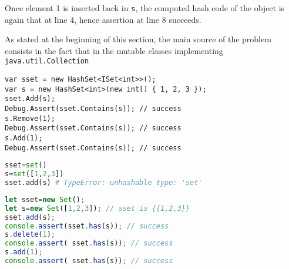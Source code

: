 Once element 1 is inserted back in \lstinline{s}, the computed hash code of the object is again that at line 4, hence assertion at line 8 succeeds. 

As stated at the beginning of this section, the main source of the problem consists in the fact that in the mutable classes implementing \lstinline{java.util.Collection}

\begin{lstlisting}
var sset = new HashSet<ISet<int>>();
var s = new HashSet<int>(new int[] { 1, 2, 3 });
sset.Add(s);
Debug.Assert(sset.Contains(s)); // success
s.Remove(1);
Debug.Assert(sset.Contains(s)); // success 
s.Add(1);
Debug.Assert(sset.Contains(s)); // success
\end{lstlisting}


\begin{lstlisting}[language=Python]
sset=set()                                                           
s=set([1,2,3])                                                         
sset.add(s) # TypeError: unhashable type: 'set'       
\end{lstlisting}

\begin{lstlisting}[language=Javascript]
let sset=new Set();                                                           
let s=new Set([1,2,3]); // sset is {{1,2,3}}                                                         
sset.add(s);
console.assert(sset.has(s)); // success
s.delete(1);
console.assert( sset.has(s)); // success
s.add(1);
console.assert( sset.has(s)); // success
\end{lstlisting}




